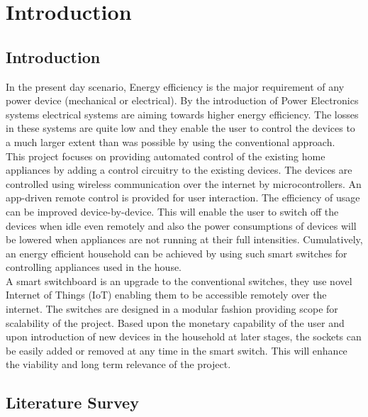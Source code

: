 \chapter{Introduction}
        \section{Introduction}
        
        In the present day scenario, Energy efficiency is the major requirement of any power device (mechanical or electrical). By the introduction of Power Electronics systems electrical systems are aiming towards higher energy efficiency. The losses in these systems are quite low and they enable the user to control the devices to a much larger extent than was possible by using the conventional approach. \\
        
        This project focuses on providing automated control of the existing home appliances by adding a control circuitry to the existing devices. The devices are controlled using wireless communication over the internet by microcontrollers. An app-driven remote control is provided for user interaction. The efficiency of usage can be improved device-by-device. This will enable the user to switch off the devices when idle even remotely and also the power consumptions of devices will be lowered when appliances are not running at their full intensities. Cumulatively, an energy efficient household can be achieved by using such smart switches for controlling appliances used in the house. \\
        
        A smart switchboard is an upgrade to the conventional switches, they use novel Internet of Things (IoT) enabling them to be accessible remotely over the internet. The switches are designed in a modular fashion providing scope for scalability of the project. Based upon the monetary capability of the user and upon introduction of new devices in the household at later stages, the sockets can be easily added or removed at any time in the smart switch. This will enhance the viability and long term relevance of the project.\\ \newpage
        
        \section{Literature Survey}
